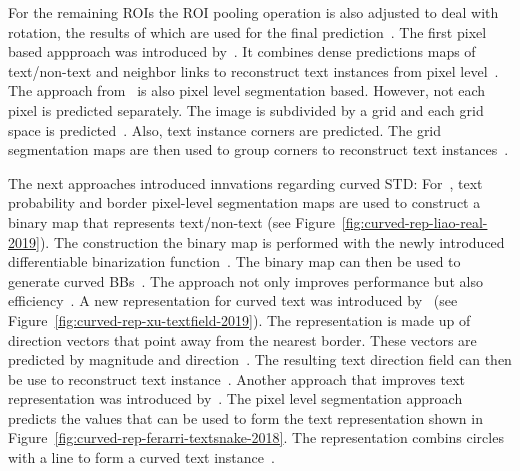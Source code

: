 For the remaining \acp{ROI} the \ac{ROI} pooling operation is also adjusted to deal with rotation,
the results of which are used for the final prediction~\citep{ma_arbitrary-oriented_2018}.
The first pixel based appproach was introduced by~\cite{deng_pixellink_2018}.
It combines dense predictions maps of text/non-text and neighbor links to reconstruct text instances
from pixel level~\citep{deng_pixellink_2018}.
The approach from~\cite{lyu_multi-oriented_2018} is also pixel level segmentation based.
However, not each pixel is predicted separately.
The image is subdivided by a grid and each grid space is predicted~\citep{lyu_multi-oriented_2018}.
Also, text instance corners are predicted.
The grid segmentation maps are then used to group corners to reconstruct text
instances~\citep{lyu_multi-oriented_2018}.

The next approaches introduced innvations regarding curved \ac{STD}:
For~\cite{liao_real-time_2019}, text probability and border pixel-level segmentation maps are used
to construct a binary map that represents text/non-text (see
Figure~\ref{fig:curved-rep-liao-real-2019}).
The construction the binary map is performed with the newly introduced differentiable binarization
function~\citep{liao_real-time_2019}.
The binary map can then be used to generate curved \acp{BB}~\citep{liao_real-time_2019}.
The approach not only improves performance but also efficiency~\citep{liao_real-time_2019}.
A new representation for curved text was introduced
by~\cite{xu_textfield_2019} (see Figure~\ref{fig:curved-rep-xu-textfield-2019}).
The representation is made up of direction vectors that point away from the nearest border.
These vectors are predicted by magnitude and direction~\citep{xu_textfield_2019}.
The resulting text direction field can then be use to reconstruct text
instance~\citep{xu_textfield_2019}.
Another approach that improves text representation was introduced by~\cite{ferrari_textsnake_2018}.
The pixel level segmentation approach predicts the values that can be used to form the text
representation shown in Figure~\ref{fig:curved-rep-ferarri-textsnake-2018}.
The representation combins circles with a line to form a curved text
instance~\citep{ferrari_textsnake_2018}.
